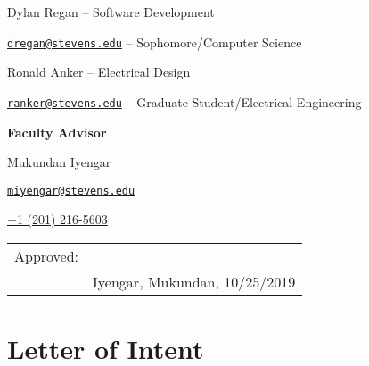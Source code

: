 \documentclass{article}
\let\Oldsection\section
\renewcommand{\section}{\FloatBarrier\Oldsection}
\begin{document}
\begin{center}
{Dylan Regan -- Software Development

\href{mailto:dregan@stevens.edu}{\nolinkurl{dregan@stevens.edu}} -- Sophomore/Computer Science

\bigskip
\bigskip

Ronald Anker -- Electrical Design

\href{mailto:ranker@stevens.edu}{\nolinkurl{ranker@stevens.edu}} -- Graduate Student/Electrical Engineering

\bigskip
\bigskip

\textbf{Faculty Advisor}

Mukundan Iyengar

\href{mailto:miyengar@stevens.edu}{\nolinkurl{miyengar@stevens.edu}}

\href{tel:12012165603}{+1 (201) 216-5603}

\bigskip
\bigskip
\bigskip
\bigskip
\bigskip
\bigskip
\bigskip
\bigskip
\bigskip
\bigskip
\bigskip

\begin{tabular}{@{}p{.5in}p{3.5in}@{}}
Approved: & \hrulefill \\
& Iyengar, Mukundan, 10/25/2019\\
\end{tabular}
}

\end{center}

\fi

\newpage

{
\tableofcontents
}

\newpage

\section{Letter of Intent}
\end{document}
